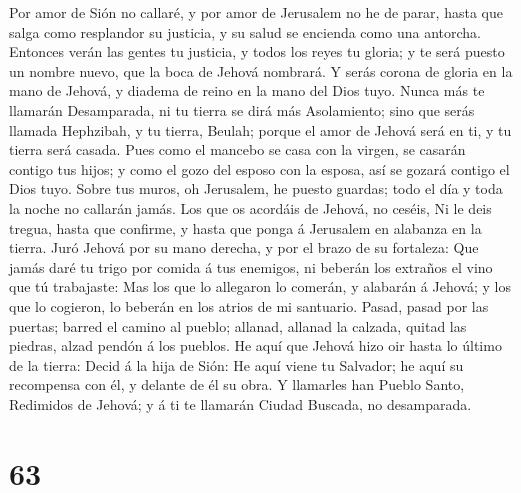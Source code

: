  Por amor de Sión no callaré, y por amor de Jerusalem no he
de parar, hasta que salga como resplandor su justicia, y su salud se
encienda como una antorcha.  Entonces verán las gentes tu
justicia, y todos los reyes tu gloria; y te será puesto un nombre nuevo,
que la boca de Jehová nombrará.  Y serás corona de gloria en
la mano de Jehová, y diadema de reino en la mano del Dios tuyo.
 Nunca más te llamarán Desamparada, ni tu tierra se dirá más
Asolamiento; sino que serás llamada Hephzibah, y tu tierra, Beulah;
porque el amor de Jehová será en ti, y tu tierra será casada.
 Pues como el mancebo se casa con la virgen, se casarán
contigo tus hijos; y como el gozo del esposo con la esposa, así se
gozará contigo el Dios tuyo.  Sobre tus muros, oh Jerusalem,
he puesto guardas; todo el día y toda la noche no callarán jamás. Los
que os acordáis de Jehová, no ceséis,  Ni le deis tregua,
hasta que confirme, y hasta que ponga á Jerusalem en alabanza en la
tierra.  Juró Jehová por su mano derecha, y por el brazo de
su fortaleza: Que jamás daré tu trigo por comida á tus enemigos, ni
beberán los extraños el vino que tú trabajaste:  Mas los que
lo allegaron lo comerán, y alabarán á Jehová; y los que lo cogieron, lo
beberán en los atrios de mi santuario.  Pasad, pasad por
las puertas; barred el camino al pueblo; allanad, allanad la calzada,
quitad las piedras, alzad pendón á los pueblos.  He aquí
que Jehová hizo oir hasta lo último de la tierra: Decid á la hija de
Sión: He aquí viene tu Salvador; he aquí su recompensa con él, y delante
de él su obra.  Y llamarles han Pueblo Santo, Redimidos de
Jehová; y á ti te llamarán Ciudad Buscada, no desamparada.

\hypertarget{section-62}{%
\section{63}\label{section-62}}

